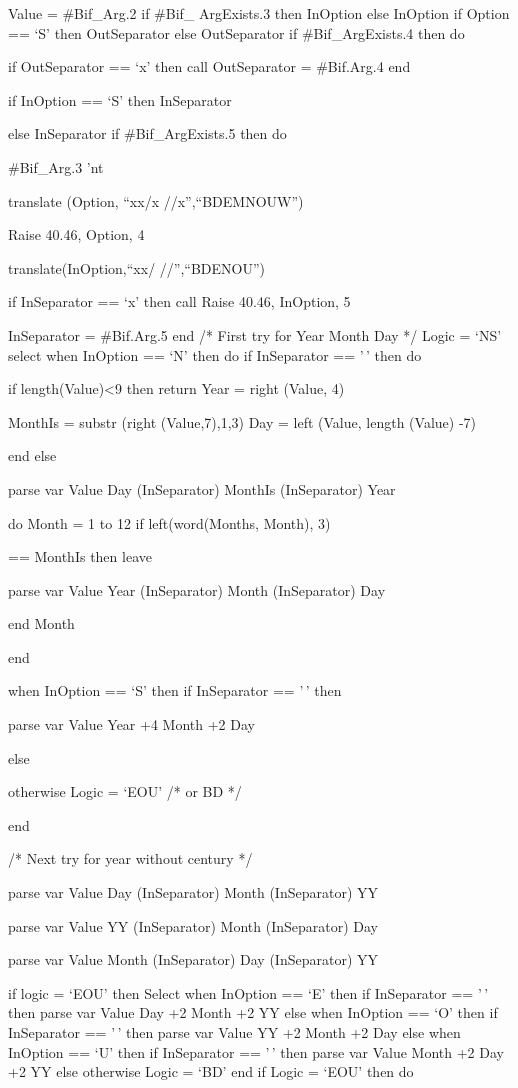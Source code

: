 Value = \#Bif\_Arg.2 if \#Bif\_ ArgExists.3 then InOption else InOption
if Option == `S' then OutSeparator else OutSeparator if
\#Bif\_ArgExists.4 then do

if OutSeparator == `x' then call OutSeparator = \#Bif.Arg.4 end

if InOption == `S' then InSeparator

else InSeparator if \#Bif\_ArgExists.5 then do

\#Bif\_Arg.3 'nt

translate (Option, ``xx/x //x'',``BDEMNOUW'')

Raise 40.46, Option, 4

translate(InOption,``xx/ //'',``BDENOU'')

if InSeparator == `x' then call Raise 40.46, InOption, 5

InSeparator = \#Bif.Arg.5 end /* First try for Year Month Day */ Logic =
`NS' select when InOption == `N' then do if InSeparator == '\,' then do

if length(Value)\textless9 then return Year = right (Value, 4)

MonthIs = substr (right (Value,7),1,3) Day = left (Value, length (Value)
-7)

end else

parse var Value Day (InSeparator) MonthIs (InSeparator) Year

do Month = 1 to 12 if left(word(Months, Month), 3)

== MonthIs then leave

parse var Value Year (InSeparator) Month (InSeparator) Day

end Month

end

when InOption == `S' then if InSeparator == '\,' then

parse var Value Year +4 Month +2 Day

else

otherwise Logic = `EOU' /* or BD */

end

/* Next try for year without century */

parse var Value Day (InSeparator) Month (InSeparator) YY

parse var Value YY (InSeparator) Month (InSeparator) Day

parse var Value Month (InSeparator) Day (InSeparator) YY

if logic = `EOU' then Select when InOption == `E' then if InSeparator ==
'\,' then parse var Value Day +2 Month +2 YY else when InOption == `O'
then if InSeparator == '\,' then parse var Value YY +2 Month +2 Day else
when InOption == `U' then if InSeparator == '\,' then parse var Value
Month +2 Day +2 YY else otherwise Logic = `BD' end if Logic = `EOU' then
do


